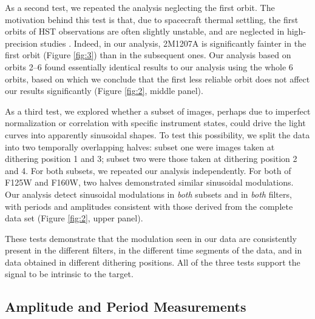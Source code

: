 \documentclass[apj]{emulateapj}
\begin{document}
As a second test, we repeated the analysis neglecting the first
orbit. The motivation behind this test is that, due to spacecraft
thermal settling, the first orbits of HST observations are often
slightly unstable, and are neglected in high-precision studies
\citep[e.g.][]{Mandell2013}. Indeed, in our analysis, 2M1207A is
significantly fainter in the first orbit (Figure \ref{fig:3}) than in
the subsequent ones.  Our analysis based on orbits 2--6 found
essentially identical results to our analysis using the whole 6 orbits, based on
which we conclude that the first less reliable orbit does not affect
our results significantly (Figure \ref{fig:2}, middle panel).

As a third test, we explored whether a subset of images, perhaps due to
imperfect normalization or correlation with specific instrument states,
could drive the light curves into apparently sinusoidal shapes. To
test this possibility, we split the data into two temporally
overlapping halves: subset one were images taken at dithering position
1 and 3; subset two were those taken at dithering position 2 and
4. For both subsets, we repeated our analysis independently.  For both
of F125W and F160W, two halves demonstrated similar sinusoidal
modulations.  Our analysis detect sinusoidal modulations in {\em both}
subsets and in {\em both} filters, with periods and amplitudes
consistent with those derived from the complete data set (Figure
\ref{fig:2}, upper panel).
 
 These tests demonstrate that the modulation seen in our data are
 consistently present in the different filters, in the different time
 segments of the data, and in data obtained in different dithering
 positions. All of the three tests support the signal to be
 intrinsic to the target. 
 

\subsection{Amplitude and Period Measurements}

\end{document}

